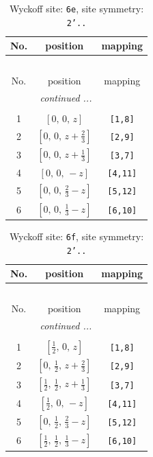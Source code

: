 \documentclass[fleqn,8pt]{jsarticle}
\begin{document}
\begin{longtable}{ccc}
\caption{Wyckoff site: {\tt 6e}, site symmetry: {\tt 2'..}}
 \\
 \hline \hline
No. & position & mapping \\ \hline \endfirsthead

\multicolumn{2}{l}{\tablename\ \thetable{}} \\
 \hline \hline
No. & position & mapping \\ \hline \endhead

 \hline \hline
\multicolumn{2}{r}{\footnotesize\it continued ...} \\ \endfoot

 \hline \hline
\multicolumn{2}{r}{} \\ \endlastfoot

1 & $\left[ 0,\, 0,\, z \right]$ & {\tt [1,8]} \\ \hline
2 & $\left[ 0,\, 0,\, z + \frac{2}{3} \right]$ & {\tt [2,9]} \\ \hline
3 & $\left[ 0,\, 0,\, z + \frac{1}{3} \right]$ & {\tt [3,7]} \\ \hline
4 & $\left[ 0,\, 0,\, - z \right]$ & {\tt [4,11]} \\ \hline
5 & $\left[ 0,\, 0,\, \frac{2}{3} - z \right]$ & {\tt [5,12]} \\ \hline
6 & $\left[ 0,\, 0,\, \frac{1}{3} - z \right]$ & {\tt [6,10]} \\
\end{longtable}
\renewcommand{\arraystretch}{1.2}
\begin{longtable}{ccc}
\caption{Wyckoff site: {\tt 6f}, site symmetry: {\tt 2'..}}
 \\
 \hline \hline
No. & position & mapping \\ \hline \endfirsthead

\multicolumn{2}{l}{\tablename\ \thetable{}} \\
 \hline \hline
No. & position & mapping \\ \hline \endhead

 \hline \hline
\multicolumn{2}{r}{\footnotesize\it continued ...} \\ \endfoot

 \hline \hline
\multicolumn{2}{r}{} \\ \endlastfoot

1 & $\left[ \frac{1}{2},\, 0,\, z \right]$ & {\tt [1,8]} \\ \hline
2 & $\left[ 0,\, \frac{1}{2},\, z + \frac{2}{3} \right]$ & {\tt [2,9]} \\ \hline
3 & $\left[ \frac{1}{2},\, \frac{1}{2},\, z + \frac{1}{3} \right]$ & {\tt [3,7]} \\ \hline
4 & $\left[ \frac{1}{2},\, 0,\, - z \right]$ & {\tt [4,11]} \\ \hline
5 & $\left[ 0,\, \frac{1}{2},\, \frac{2}{3} - z \right]$ & {\tt [5,12]} \\ \hline
6 & $\left[ \frac{1}{2},\, \frac{1}{2},\, \frac{1}{3} - z \right]$ & {\tt [6,10]} \\
\end{longtable}
\end{document}
